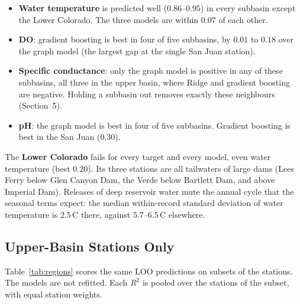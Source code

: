 \documentclass[12pt]{article}
\begin{document}
\begin{itemize}
  \item \textbf{Water temperature} is predicted well ($0.86$--$0.95$) in every subbasin except the
        Lower Colorado. The three models are within $0.07$ of each other.
  \item \textbf{DO}: gradient boosting is best in four of five subbasins, by $0.01$ to $0.18$ over
        the graph model (the largest gap at the single San Juan station).
  \item \textbf{Specific conductance}: only the graph model is positive in any of these subbasins,
        all three in the upper basin, where Ridge and gradient boosting are negative. Holding a
        subbasin out removes exactly these neighbours (Section~5).
  \item \textbf{pH}: the graph model is best in four of five subbasins. Gradient boosting is best
        in the San Juan ($0.30$).
\end{itemize}

The \textbf{Lower Colorado} fails for every target and every model, even water temperature (best
$0.20$). Its three stations are all tailwaters of large dams (Lees Ferry below Glen Canyon Dam,
the Verde below Bartlett Dam, and above Imperial Dam). Releases of deep reservoir water mute the
annual cycle that the seasonal terms expect: the median within-record standard deviation of water
temperature is $2.5$\,\textdegree C there, against $5.7$--$6.5$\,\textdegree C elsewhere.

\subsection{Upper-Basin Stations Only}

Table~\ref{tab:regions} scores the same LOO predictions on subsets of the stations. The models are
not refitted. Each $R^2$ is pooled over the stations of the subset, with equal station weights.
\end{document}
